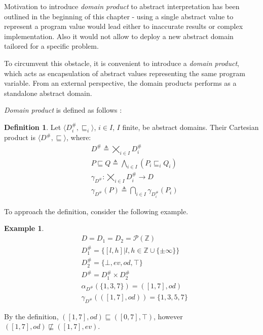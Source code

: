 \documentclass[12pt,oneside]{fithesis2}
\theoremstyle{definition}
\newtheorem{exmp}{Example}[section]
\newtheorem{definition}{Definition}
\begin{document}
Motivation to introduce \textit{domain product} to abstract interpretation has been outlined in the beginning of this chapter - using a single abstract value to represent a program value would lead either to inaccurate results or complex implementation. Also it would not allow to deploy a new abstract domain tailored for a specific problem. \cite{CousotEtAl06-ASIAN}

To circumvent this obstacle, it is convenient to introduce a \textit{domain product}, which acts as encapsulation of abstract values representing the same program variable. From an external perspective, the domain products performs as a standalone abstract domain.

\textit{Domain product} is defined as follows \cite{CousotCousotMauborgne-FoSSaCS-11}:

\begin{definition}
  Let $\langle D^\#_i, \sqsubseteq_i \rangle$, $i \in I$, $I$ finite, be abstract domains. Their Cartesian product is $\langle D^\#, \sqsubseteq \rangle$, where:
  \begin{align*}
    &D^\# \triangleq \bigtimes_{i \in I} D^\#_i\\
    &P \sqsubseteq Q \triangleq \bigwedge_{i \in I}\left(P_i \sqsubseteq_i Q_i \right)\\
    &\gamma_{D^\#}: \bigtimes_{i \in I} D^\#_i \to D\\
    &\gamma_{D^\#}(P) \triangleq \bigcap_{i \in I} \gamma_{D^\#_i}\left( P_i \right)
  \end{align*}
\end{definition}

To approach the definition, consider the following example.

\begin{exmp}
  \begin{align*}
    &D = D_1 = D_2 = \mathcal P(\mathbb Z)\\
    &D^\#_1 = \{[l,h] | l,h \in \mathbb{Z} \cup \{\pm\infty\}\}\\
    &D^\#_2 = \{\bot, ev, od, \top\}\\
    &D^\# = D^\#_1 \times D^\#_2\\
    &\alpha_{D^\#}(\{1,3,7\}) = \left( [1,7], od \right)\\
    &\gamma_{D^\#}(\left( [1, 7], od \right)) = \{1,3,5,7\}
  \end{align*}

  By the definition, $\left( [1, 7], od \right) \sqsubseteq \left( [0, 7], \top \right)$, however $\left( [1, 7], od \right) \not\sqsubseteq \left( [1, 7], ev \right)$.
\end{exmp}
\end{document}

